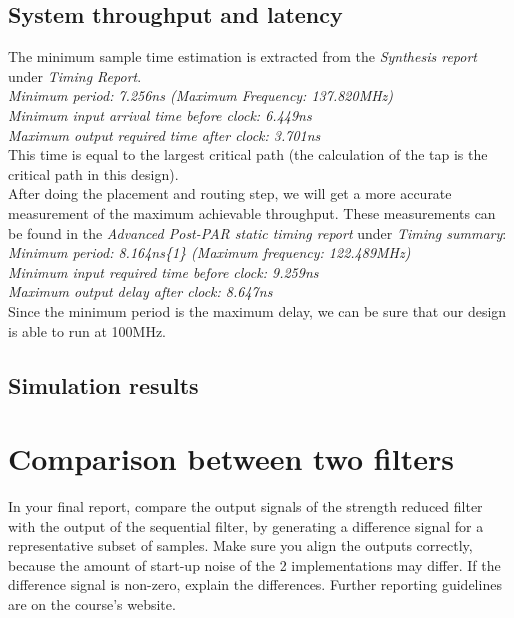 \documentclass[a4paper,twoside,11pt, fleqn]{article}
\begin{document}
\subsection{System throughput and latency}
The minimum sample time estimation is extracted from the \textit{Synthesis report} under \textit{Timing Report}.\\

   \textit{Minimum period:  7.256ns (Maximum Frequency: 137.820MHz)\\
   Minimum input arrival time before clock: 6.449ns\\
   Maximum output required time after clock: 3.701ns}\\

This time is equal to the largest critical path (the calculation of the tap is the critical path in this design).\\

After doing the placement and routing step, we will get a more accurate measurement of the maximum achievable throughput. These measurements can be found in the \textit{Advanced Post-PAR static timing report} under \textit{Timing summary}:\\

\textit{Minimum period:   8.164ns\{1\}   (Maximum frequency: 122.489MHz)\\
   Minimum input required time before clock:   9.259ns\\
   Maximum output delay after clock:   8.647ns}\\

Since the minimum period is the maximum delay, we can be sure that our design is able to run at 100MHz.

\subsection{Simulation results}



\newpage
\section{Comparison between two filters}
In your final report, compare the output signals of the strength reduced filter with the output of the sequential filter, by generating a difference signal for a representative subset of
samples. Make sure you align the outputs correctly, because the amount of start-up noise of
the 2 implementations may differ. If the difference signal is non-zero, explain the differences.
Further reporting guidelines are on the course’s website.
\end{document}
